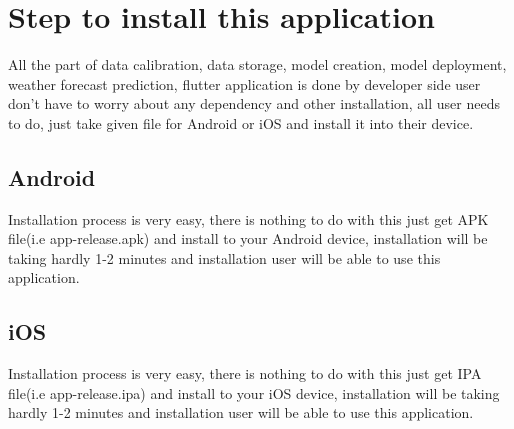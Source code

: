 \section{Step to install this application}
All the part of data calibration, data storage, model creation, model deployment, weather forecast prediction, flutter application is done by developer side user don't have to worry about any dependency and other installation, all user needs to do, just take given file for Android or iOS and install it into their device.

\subsection{Android}
Installation process is very easy, there is nothing to do with this just get APK file(i.e app-release.apk) and install to your Android device, installation will be taking hardly 1-2 minutes and installation user will be able to use this application.

\subsection{iOS}
Installation process is very easy, there is nothing to do with this just get IPA file(i.e app-release.ipa) and install to your iOS device, installation will be taking hardly 1-2 minutes and installation user will be able to use this application.